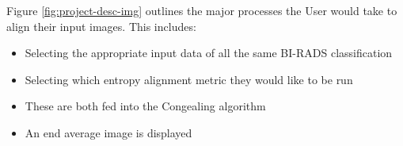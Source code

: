 Figure \ref{fig:project-desc-img} outlines the major processes the User would take to align their input images. This includes:

\begin{itemize}
  \item Selecting the appropriate input data of all the same BI-RADS classification
  \item Selecting which entropy alignment metric they would like to be run
  \item These are both fed into the Congealing algorithm
  \item An end average image is displayed
\end{itemize}
